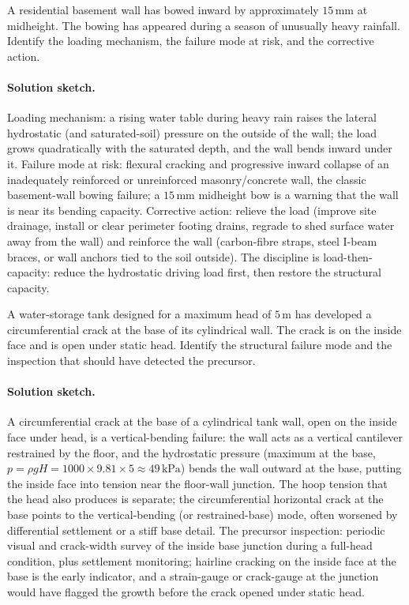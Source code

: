 \begin{exercise}
A residential basement wall has bowed inward by approximately
$15\,\si{\milli\meter}$ at midheight. The bowing has appeared
during a season of unusually heavy rainfall. Identify the
loading mechanism, the failure mode at risk, and the corrective
action.

\paragraph{Solution sketch.} Loading mechanism: a rising water table
during heavy rain raises the lateral hydrostatic (and saturated-soil)
pressure on the outside of the wall; the load grows quadratically with
the saturated depth, and the wall bends inward under it. Failure mode at
risk: flexural cracking and progressive inward collapse of an
inadequately reinforced or unreinforced masonry/concrete wall, the
classic basement-wall bowing failure; a $15\,\si{\milli\meter}$ midheight
bow is a warning that the wall is near its bending capacity. Corrective
action: relieve the load (improve site drainage, install or clear
perimeter footing drains, regrade to shed surface water away from the
wall) and reinforce the wall (carbon-fibre straps, steel I-beam braces,
or wall anchors tied to the soil outside). The discipline is
load-then-capacity: reduce the hydrostatic driving load first, then
restore the structural capacity.
\end{exercise}

\begin{exercise}
A water-storage tank designed for a maximum head of $5\,\si{\meter}
$ has developed a circumferential crack at the base of its
cylindrical wall. The crack is on the inside face and is open
under static head. Identify the structural failure mode and the
inspection that should have detected the precursor.

\paragraph{Solution sketch.} A circumferential crack at the base of a
cylindrical tank wall, open on the inside face under head, is a
vertical-bending failure: the wall acts as a vertical cantilever
restrained by the floor, and the hydrostatic pressure (maximum at the
base, $p = \rho g H = 1000\times9.81\times5 \approx 49\,\text{kPa}$)
bends the wall outward at the base, putting the inside face into tension
near the floor-wall junction. The hoop tension that the head also
produces is separate; the circumferential horizontal crack at the base
points to the vertical-bending (or restrained-base) mode, often worsened
by differential settlement or a stiff base detail. The precursor
inspection: periodic visual and crack-width survey of the inside base
junction during a full-head condition, plus settlement monitoring;
hairline cracking on the inside face at the base is the early indicator,
and a strain-gauge or crack-gauge at the junction would have flagged the
growth before the crack opened under static head.
\end{exercise}

